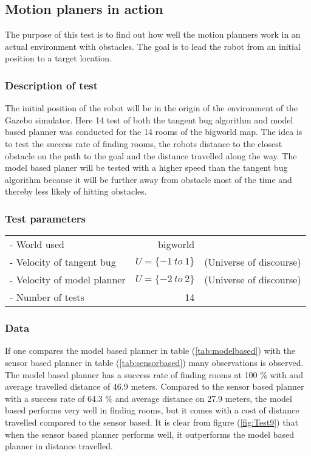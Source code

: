 \documentclass[../Head/Main.tex]{subfiles}
\begin{document}
\subsection{Motion planers in action}
\label{subsec:testMotionPlanning}

The purpose of this test is to find out how well the motion planners work in an actual environment with obstacles. The goal is to lead the robot from an initial position to a target location. 

\subsubsection*{Description of test}

The initial position of the robot will be in the origin of the environment of the Gazebo simulator. Here 14 test of both the tangent bug algorithm and model based planner was conducted for the 14 rooms of the bigworld map. The idea is to test the success rate of finding rooms, the robots distance to the closest obstacle on the path to the goal and the distance travelled along the way. The model based planer will be tested with a higher speed than the tangent bug algorithm because it will be further away from obstacle most of the time and thereby less likely of hitting obstacles.           

\subsubsection*{Test parameters}

\begin{tabular}{l r l}
	- World used                    & bigworld & \\	
	- Velocity of tangent bug       & $U=\{-1~to~1\}$ & (Universe of discourse)\\
	- Velocity of model planner     & $U=\{-2~to~2\}$ & (Universe of discourse)\\
	- Number of tests               & 14 & 
\end{tabular}

\subsubsection*{Data}

If one compares the model based planner in table (\ref{tab:modelbased}) with the sensor based planner in table (\ref{tab:sensorbased}) many observations is observed. The model based planner has a success rate of finding rooms at 100 \% with and average travelled distance of 46.9 meters. Compared to the sensor based planner with a success rate of 64.3 \% and average distance on 27.9 meters, the model based performs very well in finding rooms, but it comes with a cost of distance travelled compared to the sensor based. It is clear from figure (\ref{fig:Test9}) that when the sensor based planner performs well, it outperforms the model based planner in distance travelled.    
\end{document}
